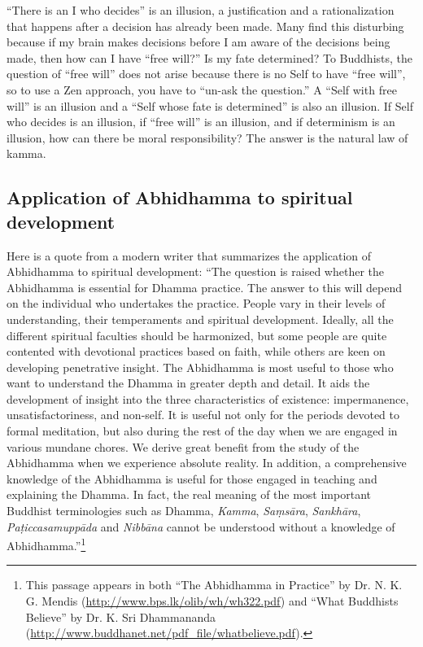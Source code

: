 “There is an I who decides” is an illusion, a justification and a rationalization that happens after a decision has already been made. Many find this disturbing because if my brain makes decisions before I am aware of the decisions being made, then how can I have “free will?” Is my fate determined? To Buddhists, the question of “free will” does not arise because there is no Self to have “free will”, so to use a Zen approach, you have to “un-ask the question.” A “Self with free will” is an illusion and a “Self whose fate is determined” is also an illusion. If Self who decides is an illusion, if “free will” is an illusion, and if determinism is an illusion, how can there be moral responsibility? The answer is the natural law of kamma.

\pagebreak

\subsection*{Application of Abhidhamma to spiritual development}

Here is a quote from a modern writer that summarizes the application of Abhidhamma to spiritual development: “The question is raised whether the Abhidhamma is essential for Dhamma practice. The answer to this will depend on the individual who undertakes the practice. People vary in their levels of understanding, their temperaments and spiritual development. Ideally, all the different spiritual faculties should be harmonized, but some people are quite contented with devotional practices based on faith, while others are keen on developing penetrative insight. The Abhidhamma is most useful to those who want to understand the Dhamma in greater depth and detail. It aids the development of insight into the three characteristics of existence: impermanence, unsatisfactoriness, and non-self. It is useful not only for the periods devoted to formal meditation, but also during the rest of the day when we are engaged in various mundane chores. We derive great benefit from the study of the Abhidhamma when we experience absolute reality. In addition, a comprehensive knowledge of the Abhidhamma is useful for those engaged in teaching and explaining the Dhamma. In fact, the real meaning of the most important Buddhist terminologies such as Dhamma, \textit{Kamma}, \textit{Saṃsāra}, \textit{Sankhāra}, \textit{Paṭiccasamuppāda} and \textit{Nibbāna} cannot be understood without a knowledge of Abhidhamma.”\footnote{This passage appears in both “The Abhidhamma in Practice” by Dr. N. K. G. Mendis (\url{http://www.bps.lk/olib/wh/wh322.pdf}) and “What Buddhists Believe” by Dr. K. Sri Dhammananda (\url{http://www.buddhanet.net/pdf_file/whatbelieve.pdf}).}

